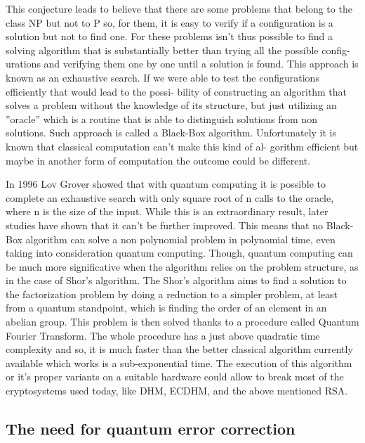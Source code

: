 \documentclass{article}
\begin{document}
This conjecture leads to believe that there are some problems that belong to
the class NP but not to P so, for them, it is easy to verify if a configuration is
a solution but not to find one. For these problems isn’t thus possible to find a
solving algorithm that is substantially better than trying all the possible config-
urations and verifying them one by one until a solution is found. This approach
is known as an exhaustive search.
If we were able to test the configurations efficiently that would lead to the possi-
bility of constructing an algorithm that solves a problem without the knowledge
of its structure, but just utilizing an ”oracle” which is a routine that is able to
distinguish solutions from non solutions.
Such approach is called a Black-Box algorithm.
Unfortunately it is known that classical computation can’t make this kind of al-
gorithm efficient but maybe in another form of computation the outcome could
be different.

\vspace{10pt}

In 1996 Lov Grover showed that with quantum computing it is possible to
complete an exhaustive search with only square root of n calls to the oracle,
where n is the size of the input. While this is an extraordinary result, later
studies have shown that it can’t be further improved.
This means that no Black-Box algorithm can solve a non polynomial problem
in polynomial time, even taking into consideration quantum computing.
Though, quantum computing can be much more significative when the algorithm
relies on the problem structure, as in the case of Shor’s algorithm.
The Shor’s algorithm aims to find a solution to the factorization problem by
doing a reduction to a simpler problem, at least from a quantum standpoint,
which is finding the order of an element in an abelian group. This problem is
then solved thanks to a procedure called Quantum Fourier Transform.
The whole procedure has a just above quadratic time complexity and so, it is
much faster than the better classical algorithm currently available which works
is a sub-exponential time.
The execution of this algorithm or it’s proper variants on a suitable hardware
could allow to break most of the cryptosystems used today, like DHM, ECDHM,
and the above mentioned RSA.


\subsection{The need for quantum error correction}
\end{document}
